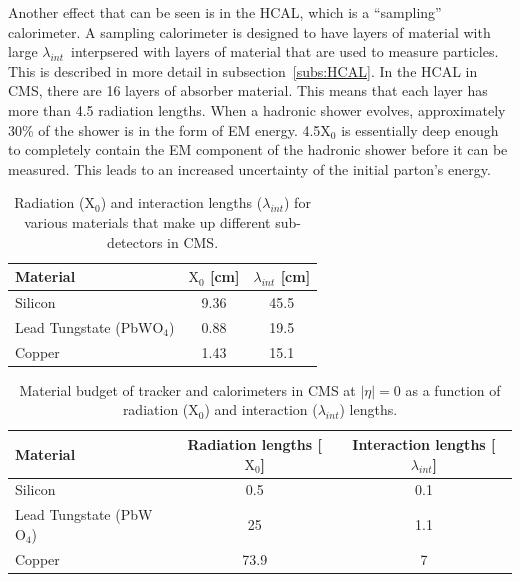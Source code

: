 Another effect that can be seen is in the HCAL, which is a ``sampling'' calorimeter.
A sampling calorimeter is designed to have layers of material with large
$\lambda_{int}$~interpsered with layers of material that are used to measure particles.
This is described in more detail in subsection~\ref{subs:HCAL}.
In the HCAL in CMS, there are 16 layers of absorber material.
This means that each layer has more than 4.5 radiation lengths.
When a hadronic shower evolves, approximately 30\% of the shower is in the form of EM energy.
4.5$\mathrm{X_{0}}$ is essentially deep enough to completely contain the EM component of the hadronic shower before it can be measured.
This leads to an increased uncertainty of the initial parton's energy.

\begin{table}[htb]                                                                                                                                                              
  \begin{center}
    \caption{
      \label{tab:rad_int_lengths}
      Radiation ($\mathrm{X_{0}}$) and interaction lengths ($\lambda_{int}$) for various materials that make up different sub-detectors in CMS.
    }
    \begin{tabular}{l|c|c}
      \hline
      \hline
      Material & $\mathrm{X_{0}}$ [cm] & $\lambda_{int}$ [cm] \\
      \hline
      Silicon                             & 9.36 & 45.5 \\
      Lead Tungstate (PbW$\mathrm{O_{4}}$) & 0.88 & 19.5 \\
      Copper                              & 1.43 & 15.1 \\
      \hline
      \hline
    \end{tabular}
  \end{center}
\end{table}

\begin{table}[htb]                                                                                                                                                              
  \begin{center}
    \caption{
      \label{tab:materialbudget}
      Material budget of tracker and calorimeters in CMS at $|\eta|=0$ as a function of radiation ($\mathrm{X_{0}}$) and interaction ($\lambda_{int}$) lengths.
    }
    \begin{tabular}{l|c|c}
      \hline
      \hline
      Material & Radiation lengths [$\mathrm{X_{0}}$] & Interaction lengths [$\lambda_{int}$]  \\
      \hline
      Silicon                             & 0.5 & 0.1 \\
      Lead Tungstate (PbW$\mathrm{O_{4}}$) & 25 & 1.1 \\
      Copper                              & 73.9 & 7 \\
      \hline
      \hline
    \end{tabular}
  \end{center}
\end{table}


